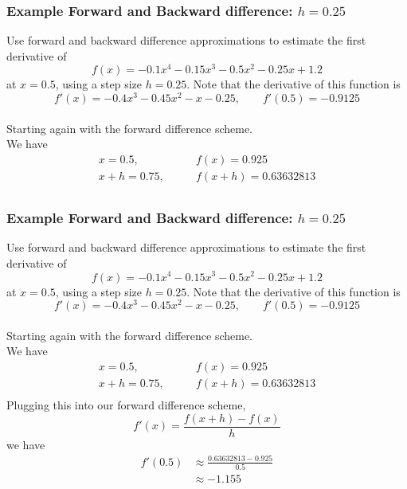 \documentclass{if-beamer}
\begin{document}

\begin{frame}
	\frametitle{Example Forward and Backward difference: $h= 0.25$}
	Use forward and backward difference approximations to estimate the first derivative of
	$$f(x) = -0.1x^4-0.15x^3-0.5x^2-0.25x+1.2 $$
	at $x=0.5$, using a step size $h = 0.25$. Note that the derivative of this function is
	$$f'(x) = -0.4x^3-0.45x^2-x-0.25, \qquad f'(0.5) = -0.9125$$
	\\\vspace{5pt}
	Starting again with the forward difference scheme.\\\vspace{5pt}
	We have
	\begin{align*}
		x = 0.5, \qquad &f(x) = 0.925\\
		x+h = 0.75, \qquad &f(x+h) = 0.63632813\\
	\end{align*}
\end{frame}


\begin{frame}
	\frametitle{Example Forward and Backward difference: $h= 0.25$}
	Use forward and backward difference approximations to estimate the first derivative of
	$$f(x) = -0.1x^4-0.15x^3-0.5x^2-0.25x+1.2 $$
	at $x=0.5$, using a step size $h = 0.25$. Note that the derivative of this function is
	$$f'(x) = -0.4x^3-0.45x^2-x-0.25, \qquad f'(0.5) = -0.9125$$
	\\\vspace{5pt}
	Starting again with the forward difference scheme.\\\vspace{5pt}
	We have
	\begin{align*}
		x = 0.5, \qquad &f(x) = 0.925\\
		x+h = 0.75, \qquad &f(x+h) = 0.63632813\\
	\end{align*}
	Plugging this into our forward difference scheme, 
	$$f'(x) = \frac{f(x+h)-f(x)}{h} $$
	we have
	\begin{align*}
		f'(0.5) &\approx \frac{0.63632813-0.925}{0.5} \\
		&\approx -1.155
	\end{align*}
\end{frame}
\end{document}
